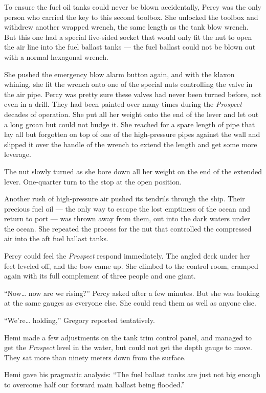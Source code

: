 \documentclass[
]{scrbook}
\begin{document}
To ensure the fuel oil tanks could never be blown accidentally, Percy
was the only person who carried the key to this second toolbox. She
unlocked the toolbox and withdrew another wrapped wrench, the same
length as the tank blow wrench. But this one had a special five-sided
socket that would only fit the nut to open the air line into the fuel
ballast tanks --- the fuel ballast could not be blown out with a normal
hexagonal wrench.

She pushed the emergency blow alarm button again, and with the klaxon
whining, she fit the wrench onto one of the special nuts controlling the
valve in the air pipe. Percy was pretty sure these valves had never been
turned before, not even in a drill. They had been painted over many
times during the \emph{Prospect} decades of operation. She put all her
weight onto the end of the lever and let out a long groan but could not
budge it. She reached for a spare length of pipe that lay all but
forgotten on top of one of the high-pressure pipes against the wall and
slipped it over the handle of the wrench to extend the length and get
some more leverage.

The nut slowly turned as she bore down all her weight on the end of the
extended lever. One-quarter turn to the stop at the open position.

Another rush of high-pressure air pushed its tendrils through the ship.
Their precious fuel oil --- the only way to escape the lost emptiness of
the ocean and return to port --- was thrown away from them, out into the
dark waters under the ocean. She repeated the process for the nut that
controlled the compressed air into the aft fuel ballast tanks.

Percy could feel the \emph{Prospect} respond immediately. The angled
deck under her feet leveled off, and the bow came up. She climbed to the
control room, cramped again with its full complement of three people and
one giant.

``Now\ldots{} now are we rising?'' Percy asked after a few minutes. But
she was looking at the same gauges as everyone else. She could read them
as well as anyone else.

``We're\ldots{} holding,'' Gregory reported tentatively.

Hemi made a few adjustments on the tank trim control panel, and managed
to get the \emph{Prospect} level in the water, but could not get the
depth gauge to move. They sat more than ninety meters down from the
surface.

Hemi gave his pragmatic analysis: ``The fuel ballast tanks are just not
big enough to overcome half our forward main ballast being flooded.''
\end{document}
